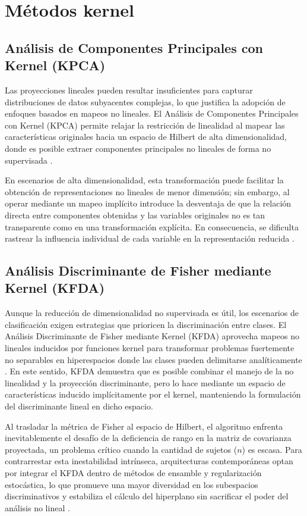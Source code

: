 \section{Métodos kernel}

\subsection{Análisis de Componentes Principales con Kernel (KPCA) }

Las proyecciones lineales pueden resultar insuficientes para capturar distribuciones de datos subyacentes complejas, lo que justifica la adopción de enfoques basados en mapeos no lineales. El Análisis de Componentes Principales con Kernel (KPCA) permite relajar la restricción de linealidad al mapear las características originales hacia un espacio de Hilbert de alta dimensionalidad, donde es posible extraer componentes principales no lineales de forma no supervisada \cite{medina2025insights}.

En escenarios de alta dimensionalidad, esta transformación puede facilitar la obtención de representaciones no lineales de menor dimensión; sin embargo, al operar mediante un mapeo implícito introduce la desventaja de que la relación directa entre componentes obtenidas y las variables originales no es tan transparente como en una transformación explícita. En consecuencia, se dificulta rastrear la influencia individual de cada variable en la representación reducida \cite{briscik2023improvement}.


\subsection{Análisis Discriminante de Fisher mediante Kernel (KFDA)}

Aunque la reducción de dimensionalidad no supervisada es útil, los escenarios de clasificación exigen estrategias que prioricen la discriminación entre clases. El Análisis Discriminante de Fisher mediante Kernel (KFDA) aprovecha mapeos no lineales inducidos por funciones kernel para transformar problemas fuertemente no separables en hiperespacios donde las clases pueden delimitarse analíticamente \cite{du2024exploring}. En este sentido, KFDA demuestra que es posible combinar el manejo de la no linealidad y la proyección discriminante, pero lo hace mediante un espacio de características inducido implícitamente por el kernel, manteniendo la formulación del discriminante lineal en dicho espacio.

Al trasladar la métrica de Fisher al espacio de Hilbert, el algoritmo enfrenta inevitablemente el desafío de la deficiencia de rango en la matriz de covarianza proyectada, un problema crítico cuando la cantidad de sujetos ($n$) es escasa. Para contrarrestar esta inestabilidad intrínseca, arquitecturas contemporáneas optan por integrar el KFDA dentro de métodos de ensamble y regularización estocástica, lo que promueve una mayor diversidad en los subespacios discriminativos y estabiliza el cálculo del hiperplano sin sacrificar el poder del análisis no lineal \cite{kim2026kernel}. 

